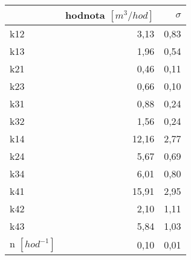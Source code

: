 \begin{tabular}{lrr}
\toprule
{} &  hodnota $\left[\si{m^3/hod}\right]$ &  $\sigma$ \\
\midrule
k12                 &                                 3,13 &      0,83 \\
k13                 &                                 1,96 &      0,54 \\
k21                 &                                 0,46 &      0,11 \\
k23                 &                                 0,66 &      0,10 \\
k31                 &                                 0,88 &      0,24 \\
k32                 &                                 1,56 &      0,24 \\
k14                 &                                12,16 &      2,77 \\
k24                 &                                 5,67 &      0,69 \\
k34                 &                                 6,01 &      0,80 \\
k41                 &                                15,91 &      2,95 \\
k42                 &                                 2,10 &      1,11 \\
k43                 &                                 5,84 &      1,03 \\
n $[\si{hod^{-1}}]$ &                                 0,10 &      0,01 \\
\bottomrule
\end{tabular}
